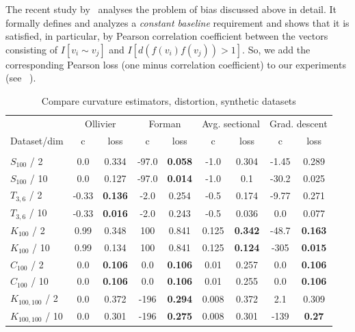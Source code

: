 \documentclass{article} %
\begin{document}
The recent study by~\cite{gosgens2019systematic} analyses the problem of bias discussed above in detail. It formally defines and analyzes a \textit{constant baseline} requirement and shows that it is satisfied, in particular, by Pearson correlation coefficient between the vectors consisting of $I[v_i \sim v_j]$ and $I[d(f(v_i)f(v_j)) > 1]$. So, we add the corresponding Pearson loss (one minus correlation coefficient) to our experiments (see ~\citep{gosgens2019systematic}).

\begin{table}[t]
\caption{Compare curvature estimators, distortion, synthetic datasets}
\label{tab:compare_distortion_synth}
\begin{center}
\begin{tabular}{lcccccc|cc}
&
\multicolumn{2}{c}{Ollivier} &
\multicolumn{2}{c}{Forman} &
\multicolumn{2}{c}{Avg. sectional} &
\multicolumn{2}{|c}{Grad. descent} \\
Dataset/dim & c & loss  & c & loss  & c & loss  & c & loss \\%
 \hline \\
$S_{100}$ / 2 &
0.0 & 0.334 & 
-97.0 & \textbf{0.058} & 
-1.0 & 0.304 &
-1.45 & 0.289 \\
$S_{100}$ / 10 &
0.0 & 0.127 & 
-97.0 & \textbf{0.014} & 
-1.0 & 0.1 & 
-30.2 & 0.025 \\
$T_{3,6}$ / 2 &
-0.33 & \textbf{0.136} & 
-2.0 & 0.254 & 
-0.5 & 0.174 & 
-9.77 & 0.271  \\
$T_{3,6}$ / 10 &
-0.33 & \textbf{0.016} & 
-2.0 & 0.243 & 
-0.5 & 0.036 & 
0.0 & 0.077 \\
$K_{100}$ / 2 & 
0.99 & 0.348 & 
100 & 0.841 & 
0.125 & \textbf{0.342} & 
-48.7 & \textbf{0.163} \\
$K_{100}$ / 10 & 
0.99 & 0.134 & 
100 & 0.841 & 
0.125 & \textbf{0.124} & 
-305 & \textbf{0.015} \\
$C_{100}$ / 2 & 
0.0 & \textbf{0.106} & 
0.0 & \textbf{0.106} & 
0.01 & 0.257 &
0.0 & \textbf{0.106}  \\
$C_{100}$ / 10 & 
0.0 & \textbf{0.106} & 
0.0 & \textbf{0.106} & 
0.01 & 0.255 & 
0.0 & \textbf{0.106} \\
$K_{100,100}$ / 2 &
0.0 & 0.372 & 
-196 & \textbf{0.294} & 
0.008 & 0.372 & 
2.1 & 0.309 \\
$K_{100,100}$ / 10 &
0.0 & 0.301 & 
-196 & \textbf{0.275} & 
0.008 & 0.301 & 
-139 & \textbf{0.27} \\
\end{tabular}
\end{center}
\end{table}
\end{document}
